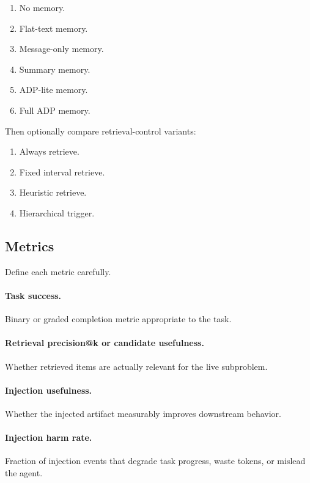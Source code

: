 \documentclass{article}
\newcommand{\ADP}{\textsc{ADP}}
\begin{document}
\begin{enumerate}[label=\textbf{M\arabic*:},leftmargin=*,itemsep=2pt,topsep=2pt]
    \item No memory.
    \item Flat-text memory.
    \item Message-only memory.
    \item Summary memory.
    \item \ADP{}-lite memory.
    \item Full \ADP{} memory.
\end{enumerate}

Then optionally compare retrieval-control variants:
\begin{enumerate}[label=\textbf{C\arabic*:},leftmargin=*,itemsep=2pt,topsep=2pt]
    \item Always retrieve.
    \item Fixed interval retrieve.
    \item Heuristic retrieve.
    \item Hierarchical trigger.
\end{enumerate}

\subsection{Metrics}
Define each metric carefully.

\paragraph{Task success.}
Binary or graded completion metric appropriate to the task.

\paragraph{Retrieval precision@k or candidate usefulness.}
Whether retrieved items are actually relevant for the live subproblem.

\paragraph{Injection usefulness.}
Whether the injected artifact measurably improves downstream behavior.

\paragraph{Injection harm rate.}
Fraction of injection events that degrade task progress, waste tokens, or mislead the agent.
\end{document}
